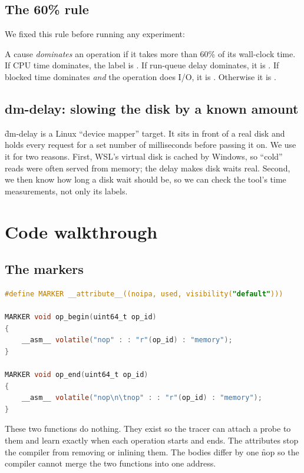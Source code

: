 \documentclass[11pt]{article}
\begin{document}
\subsection{The 60\% rule}
We fixed this rule before running any experiment:

\begin{keyidea}
A cause \emph{dominates} an operation if it takes more than 60\% of its wall-clock time. If CPU time dominates, the label is \CPUL. If run-queue delay dominates, it is \SCH. If blocked time dominates \emph{and} the operation does I/O, it is \IOW. Otherwise it is \IND.
\end{keyidea}

\subsection{dm-delay: slowing the disk by a known amount}
\f{dm-delay} is a Linux ``device mapper'' target. It sits in front of a real disk and holds every request for a set number of milliseconds before passing it on. We use it for two reasons. First, WSL's virtual disk is cached by Windows, so ``cold'' reads were often served from memory; the delay makes disk waits real. Second, we then know how long a disk wait should be, so we can check the tool's time measurements, not only its labels.

\section{Code walkthrough}

\subsection{The markers}
\begin{lstlisting}[language=C]
#define MARKER __attribute__((noipa, used, visibility("default")))

MARKER void op_begin(uint64_t op_id)
{
	__asm__ volatile("nop" : : "r"(op_id) : "memory");
}

MARKER void op_end(uint64_t op_id)
{
	__asm__ volatile("nop\n\tnop" : : "r"(op_id) : "memory");
}
\end{lstlisting}
These two functions do nothing. They exist so the tracer can attach a probe to them and learn exactly when each operation starts and ends. The attributes stop the compiler from removing or inlining them. The bodies differ by one \f{nop} so the compiler cannot merge the two functions into one address.
\end{document}
